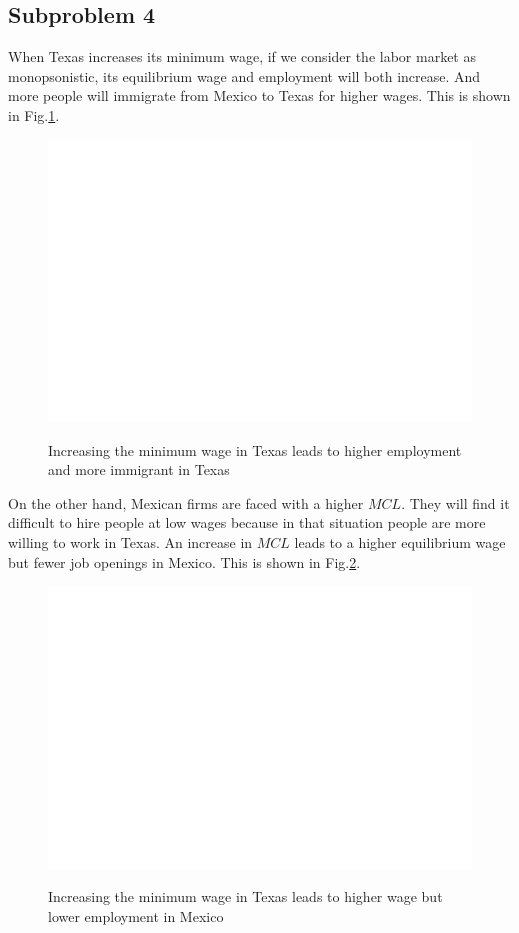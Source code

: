\documentclass{article}
\begin{document}
\subsection{Subproblem 4}
When Texas increases its minimum wage, if we consider the labor market as monopsonistic, its equilibrium wage and employment will both increase. And more people will immigrate from Mexico to Texas for higher wages. This is shown in Fig.\ref{Texas}.
\begin{figure}[!htbp]
	\centering
	\includegraphics[width=12cm]{blank.png}\\
	\caption{Increasing the minimum wage in Texas leads to higher employment and more immigrant in Texas}\label{Texas}
\end{figure}

On the other hand, Mexican firms are faced with a higher $MCL$. They will find it difficult to hire people at low wages because in that situation people are more willing to work in Texas. An increase in $MCL$ leads to a higher equilibrium wage but fewer job openings in Mexico. This is shown in Fig.\ref{Mexico}.
\begin{figure}[!htbp]
	\centering
	\includegraphics[width=12cm]{blank.png}\\
	\caption{Increasing the minimum wage in Texas leads to higher wage but lower employment in Mexico}\label{Mexico}
\end{figure}
\end{document}
